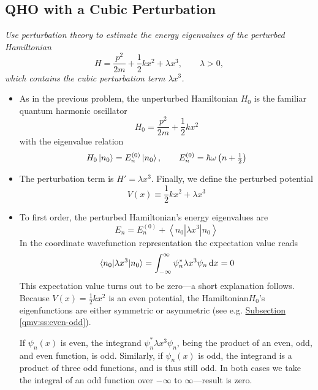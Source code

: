\documentclass[11pt, a4paper]{article}
\newcommand{\diff}{\mathop{}\!\mathrm{d}} %
\newcommand{\Ham}{Hamiltonian\xspace}
\newcommand{\threebraket}[3]{\left \langle {#1} \left | {#2} \right | {#3} \right \rangle}  %
\begin{document}
\subsection{QHO with a Cubic Perturbation}
\textit{Use perturbation theory to estimate the energy eigenvalues of the perturbed Hamiltonian}
\begin{equation*}
	H = \frac{p^{2}}{2m} + \frac{1}{2}kx^{2} + \lambda x^{3}, \qquad \lambda > 0,
\end{equation*}
\textit{which contains the cubic perturbation term $ \lambda x^{3} $.}
\begin{itemize}
	\item As in the previous problem, the unperturbed Hamiltonian $ H_{0} $ is the familiar quantum harmonic oscillator
	\begin{equation*}
		H_{0} = \frac{p^{2}}{2m} + \frac{1}{2}kx^{2}
	\end{equation*}
	with the eigenvalue relation
	\begin{equation*}
		H_{0}\ket{n_{0}} = E^{(0)}_{n} \ket{n_{0}}, \qquad E^{(0)}_{n} = \hbar \omega \left(n + \tfrac{1}{2}\right)
	\end{equation*}
	
	\item The perturbation term is $ H' = \lambda x^{3} $. Finally, we define the perturbed potential
	\begin{equation*}
		V(x) \equiv \frac{1}{2}kx^{2} + \lambda x^{3}
	\end{equation*}
	
	\item To first order, the perturbed \Ham's energy eigenvalues are
	\begin{equation*}
		E_{n} = E^{(0)}_{n} + \threebraket{n_{0}}{\lambda x^{3}}{n_{0}}
	\end{equation*}
	In the coordinate wavefunction representation the expectation value reads
	\begin{equation*}
		\mel{n_{0}}{\lambda x^{3}}{n_{0}} = \int_{-\infty}^{\infty}\psi_{n}^{*}\lambda x^{3}\psi_{n}\diff x = 0
	\end{equation*}
	This expectation value turns out to be zero---a short explanation follows. Because $ V(x) = \frac{1}{2}kx^{2} $ is an even potential, the \Ham $ H_{0} $'s eigenfunctions are either symmetric or asymmetric (see e.g. \hyperref[qmv:ss:even-odd]{Subsection \ref{qmv:ss:even-odd}}).
	
	If $ \psi_{n}(x) $ is even, the integrand $ \psi_{n}^{*}\lambda x^{3}\psi_{n} $, being the product of an even, odd, and even function, is odd. Similarly, if $ \psi_{n}(x) $ is odd, the integrand is a product of three odd functions, and is thus still odd. In both cases we take the integral of an odd function over $ -\infty $ to $ \infty $---result is zero. 
	

\end{itemize}
\end{document}
